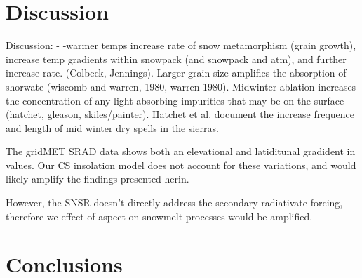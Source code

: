 \hypertarget{ch2-discussion}{\section{Discussion}\label{ch2-discussion}}


Discussion:
-	-warmer temps increase rate of snow metamorphism (grain growth), increase temp gradients within snowpack (and snowpack and atm), and further increase rate. (Colbeck, Jennings). Larger grain size amplifies the absorption of shorwate (wiscomb and warren, 1980, warren 1980). Midwinter ablation increases the concentration of any light absorbing impurities that may be on the surface (hatchet, gleason, skiles/painter). Hatchet et al. document the increase frequence and length of mid winter dry spells in the sierras. 

The gridMET SRAD data shows both an elevational and latiditunal gradident in values. Our CS insolation model does not account for these variations, and would likely amplify the findings presented herin.

However, the SNSR doesn’t directly address the secondary radiativate forcing, therefore we effect of aspect on snowmelt processes would be amplified.

\hypertarget{ch2-conclusions}{\section{Conclusions}\label{ch2-conclusions}}



